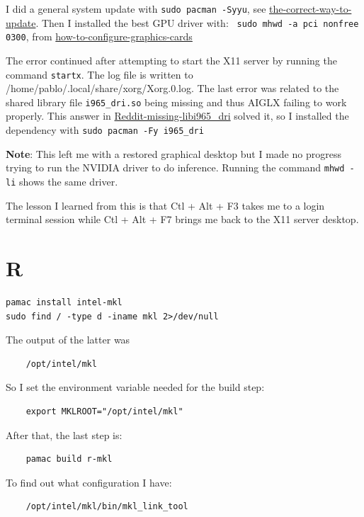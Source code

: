 \documentclass[]{scrartcl}
\begin{document}
I did a general system update with \texttt{sudo pacman -Syyu}, see \href{https://forum.manjaro.org/t/the-correct-way-to-update/28235/2}{the-correct-way-to-update}.
Then I installed the best GPU driver with: \texttt{ sudo mhwd -a pci nonfree 0300}, from  \href{https://wiki.manjaro.org/index.php/Configure_Graphics_Cards}{how-to-configure-graphics-cards}

The error continued after attempting to start the X11 server by running the command \texttt{startx}. The log file is written to /home/pablo/.local/share/xorg/Xorg.0.log.
The last error was related to the shared library file \texttt{i965\_dri.so} being missing and thus AIGLX failing to work properly.
This answer in \href{https://www.reddit.com/r/archlinux/comments/woa8bv/usrlibdrii965_driso_is_missing/}{Reddit-missing-libi965\_dri} solved it, so I installed  the dependency with \texttt{sudo pacman -Fy i965\_dri}


\textbf{Note}: This left me with a restored graphical desktop but I made no progress trying to run the NVIDIA driver to do inference. Running the command \texttt{mhwd -li} shows the same driver.


The lesson I learned from this is that Ctl + Alt + F3 takes me to a login terminal session while Ctl + Alt + F7 brings me back to the X11 server desktop. 


\section{R}

\begin{verbatim}
pamac install intel-mkl
sudo find / -type d -iname mkl 2>/dev/null
\end{verbatim}

The output of the latter was
\begin{verbatim}
	/opt/intel/mkl
\end{verbatim}

So I set the environment variable needed for the build step:

\begin{verbatim}
	export MKLROOT="/opt/intel/mkl"
\end{verbatim}

After that, the last step is:

\begin{verbatim}
	pamac build r-mkl
\end{verbatim}

To find out what configuration I have:
\begin{verbatim}
	/opt/intel/mkl/bin/mkl_link_tool
\end{verbatim} 
\end{document}

